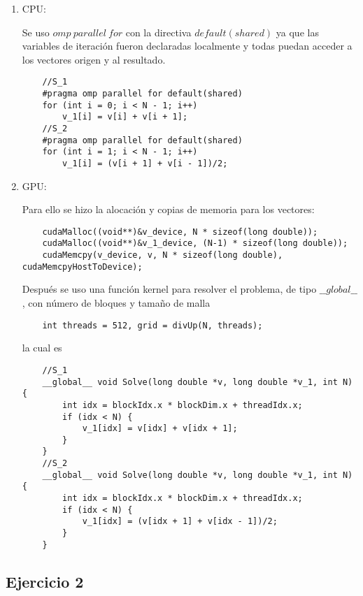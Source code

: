 \documentclass[letterpaper]{article}
\theoremstyle{definition}
\theoremstyle{lemathm}
\theoremstyle{lemathm}
\theoremstyle{lemathm}
\theoremstyle{lemademthm}
\newcommand{\1}{\mathbbm{1}}
\begin{document}
	\begin{enumerate}
		\item CPU:

		Se uso $omp\ parallel\ for$ con la directiva $default(shared)$ ya que las variables de iteración fueron declaradas localmente y todas puedan acceder a los vectores origen y al resultado.

		\begin{verbatim}
	//S_1
	#pragma omp parallel for default(shared)
    for (int i = 0; i < N - 1; i++)
        v_1[i] = v[i] + v[i + 1];
	//S_2
	#pragma omp parallel for default(shared)
    for (int i = 1; i < N - 1; i++)
        v_1[i] = (v[i + 1] + v[i - 1])/2;
		\end{verbatim}

		\item GPU:
		
		Para ello se hizo la alocación y copias de memoria para los vectores:

		\begin{verbatim}
	cudaMalloc((void**)&v_device, N * sizeof(long double));
	cudaMalloc((void**)&v_1_device, (N-1) * sizeof(long double));
	cudaMemcpy(v_device, v, N * sizeof(long double), cudaMemcpyHostToDevice);
		\end{verbatim}

		Después se uso una función kernel para resolver el problema, de tipo $\_\_global\_\_$, con número de bloques y tamaño de malla

		\begin{verbatim}
	int threads = 512, grid = divUp(N, threads);
		\end{verbatim}
		
		la cual es

		\begin{verbatim}
	//S_1
	__global__ void Solve(long double *v, long double *v_1, int N) {
		int idx = blockIdx.x * blockDim.x + threadIdx.x;
		if (idx < N) {
			v_1[idx] = v[idx] + v[idx + 1];
		}
	}
	//S_2
	__global__ void Solve(long double *v, long double *v_1, int N) {
		int idx = blockIdx.x * blockDim.x + threadIdx.x;
		if (idx < N) {
			v_1[idx] = (v[idx + 1] + v[idx - 1])/2;
		}
	}
		\end{verbatim}
	\end{enumerate}

	\newpage

	\subsection*{Ejercicio 2}
\end{document}
